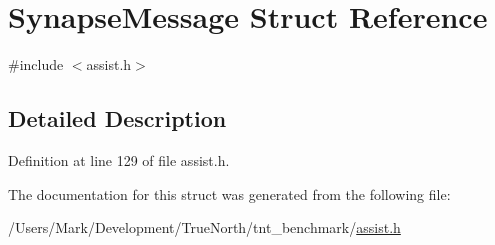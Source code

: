 \hypertarget{struct_synapse_message}{}\section{Synapse\+Message Struct Reference}
\label{struct_synapse_message}


{\ttfamily \#include $<$assist.\+h$>$}



\subsection{Detailed Description}


Definition at line 129 of file assist.\+h.



The documentation for this struct was generated from the following file\+:\begin{DoxyCompactItemize}
\item 
/\+Users/\+Mark/\+Development/\+True\+North/tnt\+\_\+benchmark/\hyperlink{assist_8h}{assist.\+h}\end{DoxyCompactItemize}
